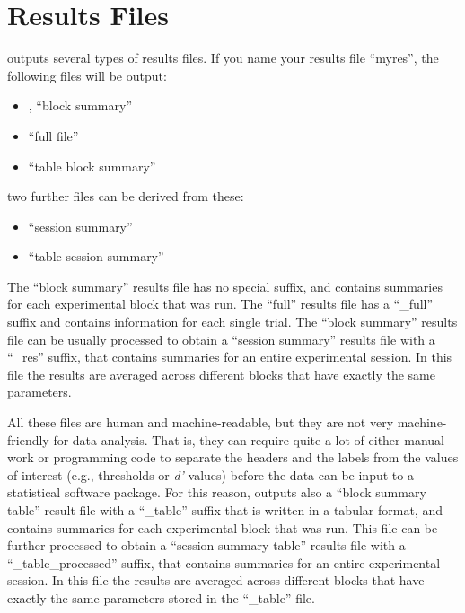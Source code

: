 \documentclass[a4paper,12pt,english]{sphinxmanual}
\begin{document}
\section{Results Files}
\label{engine:results-files}\label{engine:sec-results-files}
 outputs several types of
results files. If you name your results file “myres”, the following
files will be output:
\begin{itemize}
\item {} 
, “block summary”

\item {} 
 “full file”

\item {} 
 “table block summary”

\end{itemize}

two further files can be derived from these:
\begin{itemize}
\item {} 
 “session summary”

\item {} 
 “table session summary”

\end{itemize}

The “block summary” results file has no special suffix, and contains
summaries for each experimental block that was run. The “full” results
file has a “\_full” suffix and contains information for each single
trial. The “block summary” results file can be usually processed to
obtain a “session summary” results file with a “\_res” suffix, that
contains summaries for an entire experimental session. In this file the
results are averaged across different blocks that have exactly the same
parameters.

All these files are human and machine-readable, but they are not very
machine-friendly for data analysis. That is, they can require quite a
lot of either manual work or programming code to separate the headers
and the labels from the values of interest (e.g., thresholds or \emph{d’}
values) before the data can be input to a statistical software package.
For this reason,  outputs also a “block summary table”
result file with a “\_table” suffix that is written in a tabular format,
and contains summaries for each experimental block that was run. This
file can be further processed to obtain a “session summary table”
results file with a “\_table\_processed” suffix, that contains summaries
for an entire experimental session. In this file the results are
averaged across different blocks that have exactly the same parameters
stored in the “\_table” file.
\end{document}
